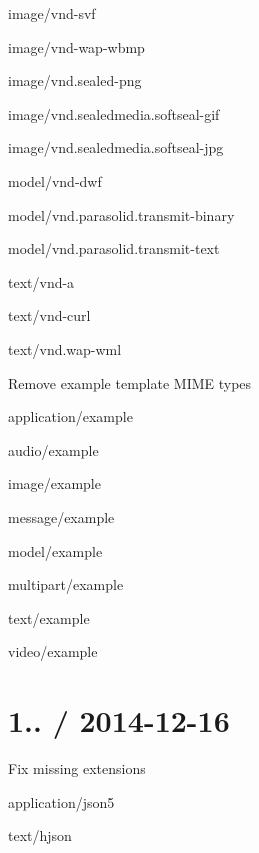\begin{DoxyItemize}
\begin{DoxyItemize}
\item {\ttfamily image/vnd-\/svf}
\item {\ttfamily image/vnd-\/wap-\/wbmp}
\item {\ttfamily image/vnd.\+sealed-\/png}
\item {\ttfamily image/vnd.\+sealedmedia.\+softseal-\/gif}
\item {\ttfamily image/vnd.\+sealedmedia.\+softseal-\/jpg}
\item {\ttfamily model/vnd-\/dwf}
\item {\ttfamily model/vnd.\+parasolid.\+transmit-\/binary}
\item {\ttfamily model/vnd.\+parasolid.\+transmit-\/text}
\item {\ttfamily text/vnd-\/a}
\item {\ttfamily text/vnd-\/curl}
\item {\ttfamily text/vnd.\+wap-\/wml}
\end{DoxyItemize}
\item Remove example template M\+I\+ME types
\begin{DoxyItemize}
\item {\ttfamily application/example}
\item {\ttfamily audio/example}
\item {\ttfamily image/example}
\item {\ttfamily message/example}
\item {\ttfamily model/example}
\item {\ttfamily multipart/example}
\item {\ttfamily text/example}
\item {\ttfamily video/example}
\end{DoxyItemize}
\end{DoxyItemize}

\section*{1.. / 2014-\/12-\/16 }


\begin{DoxyItemize}
\item Fix missing extensions
\begin{DoxyItemize}
\item {\ttfamily application/json5}
\item {\ttfamily text/hjson}
\end{DoxyItemize}
\end{DoxyItemize}

